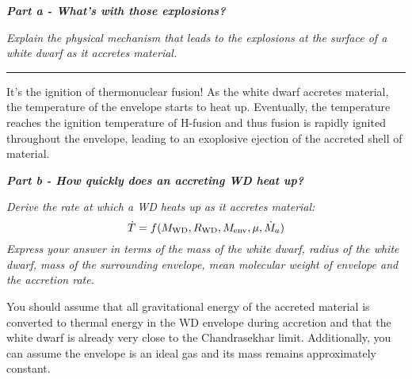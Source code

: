 \documentclass[12pt, letterpaper, twoside]{article}
\newcommand{\question}[1]{{\noindent \it #1}}
\newcommand{\answer}[1]{
    \par\noindent\rule{\textwidth}{0.4pt}#1\vspace{0.5cm}
}
\begin{document}
\clearpage

\question{\textbf{Part a - What's with those explosions?}}

\question{Explain the physical mechanism that leads to the explosions at the surface of a white dwarf as it accretes material.}

\answer{
    It's the ignition of thermonuclear fusion! As the white dwarf accretes material, the temperature of the envelope starts to heat up. Eventually, the temperature reaches the ignition temperature of H-fusion and thus fusion is rapidly ignited throughout the envelope, leading to an exoplosive ejection of the accreted shell of material.
}

\question{\textbf{Part b - How quickly does an accreting WD heat up?}}

\question{Derive the rate at which a WD heats up as it accretes material:
\begin{equation}
    \dot{T} = f(M_{\rm WD}, R_{\rm WD}, M_{\rm env}, \mu, \dot{M}_a)
\end{equation}
Express your answer in terms of the mass of the white dwarf, radius of the white dwarf, mass of the surrounding envelope, mean molecular weight of envelope and the accretion rate.

You should assume that all gravitational energy of the accreted material is converted to thermal energy in the WD envelope during accretion and that the white dwarf is already very close to the Chandrasekhar limit. Additionally, you can assume the envelope is an ideal gas and its mass remains approximately constant.}
\end{document}
